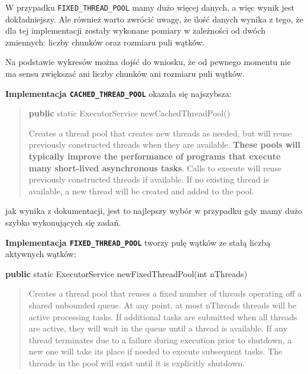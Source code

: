 \documentclass[11pt]{article}
\newenvironment{Shaded}{}{}
\newcommand{\KeywordTok}[1]{\textcolor[rgb]{0.00,0.44,0.13}{\textbf{{#1}}}}
\newcommand{\DataTypeTok}[1]{\textcolor[rgb]{0.56,0.13,0.00}{{#1}}}
\newcommand{\FunctionTok}[1]{\textcolor[rgb]{0.02,0.16,0.49}{{#1}}}
\newcommand{\NormalTok}[1]{{#1}}
\newcommand{\OperatorTok}[1]{\textcolor[rgb]{0.40,0.40,0.40}{{#1}}}
\newcommand{\BuiltInTok}[1]{{#1}}
\begin{document}
    W przypadku \texttt{FIXED\_THREAD\_POOL} mamy dużo więcej danych, a więc
wynik jest dokładniejszy. Ale również warto zwrócić uwagę, że ilość
danych wynika z tego, że dla tej implementacji zostały wykonane pomiary
w zależności od dwóch zmiennych: liczby chunków oraz rozmiaru puli
wątków.

Na podstawie wykresów można dojść do wniosku, że od pewnego momentu nie
ma sensu zwiększać ani liczby chunków ani rozmiaru puli wątków.

    \textbf{Implementacja \texttt{CACHED\_THREAD\_POOL}} okazała się
najszybsza:

\begin{quote}
\begin{Shaded}
\begin{Highlighting}[]
\KeywordTok{public} \DataTypeTok{static} \BuiltInTok{ExecutorService} \FunctionTok{newCachedThreadPool}\OperatorTok{()}
\end{Highlighting}
\end{Shaded}

Creates a thread pool that creates new threads as needed, but will reuse
previously constructed threads when they are available. \textbf{These
pools will typically improve the performance of programs that execute
many short-lived asynchronous tasks}. Calls to execute will reuse
previously constructed threads if available. If no existing thread is
available, a new thread will be created and added to the pool.
\end{quote}

jak wynika z dokumentacji, jest to najlepszy wybór w przypadku gdy mamy
dużo szybko wykonujących się zadań.

    \textbf{Implementacja \texttt{FIXED\_THREAD\_POOL}} tworzy pulę wątków
ze stałą liczbą aktywnych wątków:

\begin{Shaded}
\begin{Highlighting}[]
\KeywordTok{public} \DataTypeTok{static} \BuiltInTok{ExecutorService} \FunctionTok{newFixedThreadPool}\OperatorTok{(}\DataTypeTok{int}\NormalTok{ nThreads}\OperatorTok{)}
\end{Highlighting}
\end{Shaded}

\begin{quote}
Creates a thread pool that reuses a fixed number of threads operating
off a shared unbounded queue. At any point, at most nThreads threads
will be active processing tasks. If additional tasks are submitted when
all threads are active, they will wait in the queue until a thread is
available. If any thread terminates due to a failure during execution
prior to shutdown, a new one will take its place if needed to execute
subsequent tasks. The threads in the pool will exist until it is
explicitly shutdown.
\end{quote}
\end{document}
